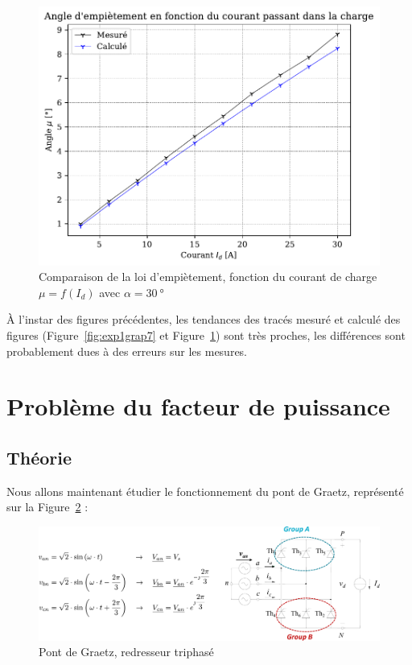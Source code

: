 \documentclass[a4paper, 11pt, openany, oneside, french]{article}
\begin{document}
\begin{figure}[!ht]
    \centering
    \includegraphics[width=0.8\linewidth]{exp1_graph9}
    \caption{Comparaison de la loi d'empiètement, fonction du courant de charge $\mu=f\left(I_d\right)$ avec $\alpha = \SI{30}{\degree}$}
    \label{fig:exp1grap9}
\end{figure}

À l'instar des figures précédentes, les tendances des tracés mesuré et calculé des figures (Figure~\ref{fig:exp1grap7} et Figure~\ref{fig:exp1grap9}) sont très proches, les différences sont probablement dues à des erreurs sur les mesures.

\clearpage
\section{Problème du facteur de puissance}
\subsection{Théorie}
Nous allons maintenant étudier le fonctionnement du pont de Graetz, représenté sur la Figure~\ref{fig:cir_graetz} :

\begin{figure}[!ht]
    \centering
    \includegraphics[width=0.8\linewidth]{graetz_tri}
    \caption{Pont de Graetz, redresseur triphasé}
    \label{fig:cir_graetz}
\end{figure}
\end{document}
